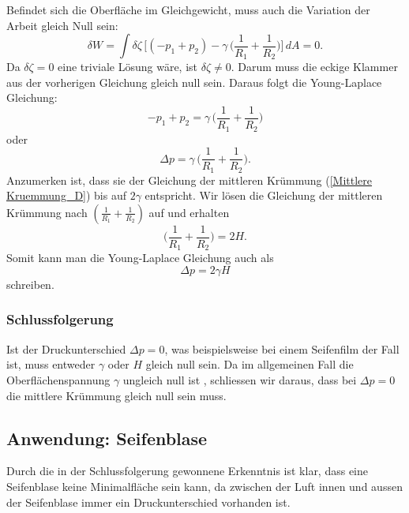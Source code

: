 \begin{refsection}
Befindet sich die Oberfläche im Gleichgewicht, muss auch die Variation der Arbeit gleich Null sein:
\begin{equation} \label{YL-Rechnung7}
\delta W = \int \delta\zeta \, \bigg[ (-p_1+p_2)-\gamma \, \bigg( \frac{1}{R_1}+\frac{1}{R_2} \bigg) \bigg]\,dA =0.
\end{equation}
Da $\delta\zeta=0$ eine triviale Lösung wäre, ist $\delta\zeta \neq 0$. Darum muss die eckige Klammer aus der vorherigen Gleichung gleich null sein. Daraus folgt die Young-Laplace Gleichung:
\begin{equation}
-p_1+p_2 = \gamma \, \bigg( \frac{1}{R_1}+\frac{1}{R_2} \bigg)
\end{equation}
oder
\begin{equation}\label{Young-Laplace-Equation}
\Delta p = \gamma \, \bigg( \frac{1}{R_1}+\frac{1}{R_2} \bigg).
\end{equation}
Anzumerken ist, dass sie der Gleichung der mittleren Krümmung (\ref{Mittlere Kruemmung_D}) bis auf $2\gamma$ entspricht. Wir lösen die Gleichung der mittleren Krümmung nach $( \frac{1}{R_1}+\frac{1}{R_2} )$ auf und erhalten
\begin{equation}
\bigg( \frac{1}{R_1}+\frac{1}{R_2} \bigg)=2H.
\end{equation}
Somit kann man die Young-Laplace Gleichung auch als
\begin{equation}\label{YL-Result2}
\Delta p=2\gamma H
\end{equation}
schreiben.

\subsubsection{Schlussfolgerung}\label{YL-conclusion}
Ist der Druckunterschied $\Delta p =0$, was beispielsweise bei einem Seifenfilm der Fall ist, muss entweder $\gamma$ oder $H$ gleich null sein. Da im allgemeinen Fall  die Oberflächenspannung $\gamma$ ungleich null ist \cite{minimal:Eotvos},  schliessen wir daraus, dass bei  $\Delta p =0$ die mittlere Krümmung gleich null sein muss.

\subsection{Anwendung: Seifenblase}
Durch die in der Schlussfolgerung gewonnene Erkenntnis ist klar, dass eine Seifenblase keine Minimalfläche sein kann, da zwischen der Luft innen und aussen der Seifenblase immer ein Druckunterschied vorhanden ist.


\end{refsection}
